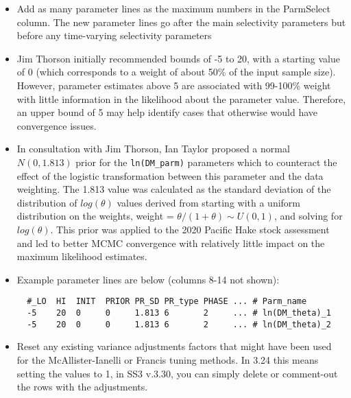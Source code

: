 \begin{itemize}
	\item Add as many parameter lines as the maximum numbers in the ParmSelect column. The new parameter lines go after the main selectivity parameters but before any time-varying selectivity parameters
	
	\item Jim Thorson initially recommended bounds of -5 to 20, with a starting value of 0
    (which corresponds to a weight of about 50\% of the input sample size). However, parameter estimates above 5 are associated with 99-100\% weight with little information in the likelihood about the parameter value. Therefore, an upper bound of 5 may help identify cases that otherwise would have convergence issues.

  \item In consultation with Jim Thorson, Ian Taylor proposed a normal $N(0, 1.813)$ prior for the \texttt{ln(DM\_parm)} parameters which to counteract the effect of the logistic transformation between this parameter and the data weighting. The 1.813 value was calculated as the standard deviation of the distribution of $log(\theta)$ values derived from starting with a uniform distribution on the weights, weight = $\theta/(1+\theta) \sim U(0,1)$, and solving for $log(\theta)$. This prior was applied to the 2020 Pacific Hake stock assessment \citep{grandin-status-2020} and led to better MCMC convergence with relatively little impact on the maximum likelihood estimates.
	
	\item Example parameter lines are below (columns 8-14 not shown): 
    \begin{small}
      \begin{minipage}{\linewidth} 
\begin{verbatim}
  #_LO  HI  INIT  PRIOR PR_SD PR_type PHASE ... # Parm_name
  -5    20  0     0     1.813 6       2     ... # ln(DM_theta)_1
  -5    20  0     0     1.813 6       2     ... # ln(DM_theta)_2
\end{verbatim}
      \end{minipage}
    \end{small}
	
	\item Reset any existing variance adjustments factors that might have been used for the McAllister-Ianelli or Francis tuning methods. In 3.24 this means setting the values to 1, in SS3 v.3.30, you can simply delete or comment-out the rows with the adjustments.
\end{itemize}

